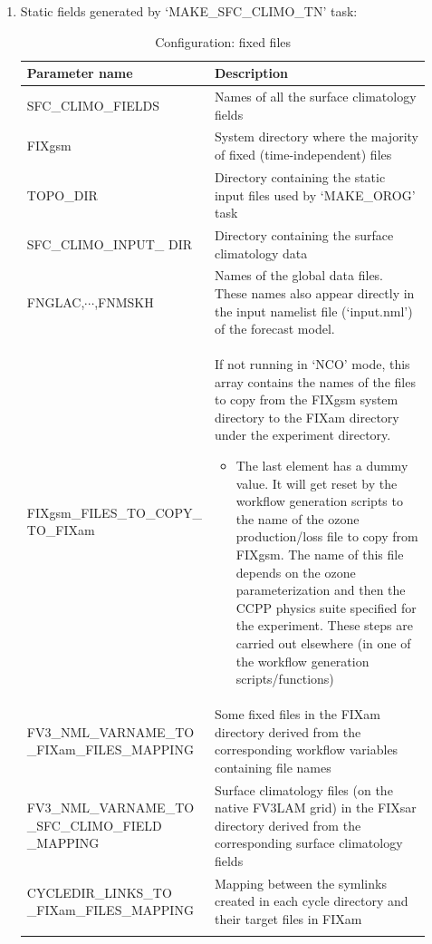 \documentclass[11pt,fleqn]{report}              %
\begin{document}
\begin{enumerate}
\item Static fields generated by `MAKE\_SFC\_CLIMO\_TN' task:
{
\scriptsize
\begin{longtable}{ p{0.23\linewidth} | p{0.7\linewidth} }
\hline
\hline
Parameter name & Description \\
\hline
SFC\_CLIMO\_FIELDS & Names of all the surface climatology fields \\
FIXgsm & System directory where the majority of fixed (time-independent) files \\
TOPO\_DIR & Directory containing the static input files used by `MAKE\_OROG' task \\
SFC\_CLIMO\_INPUT\_ DIR & Directory containing the surface climatology data \\
FNGLAC,$\cdots$,FNMSKH & Names of the global data files. These names also appear directly in the input namelist file (`input.nml') of the forecast model.  \\
FIXgsm\_FILES\_TO\_COPY\_ TO\_FIXam & If not running in `NCO' mode, this array contains the names of the files to copy from the FIXgsm system directory to the FIXam directory under the experiment directory. \begin{itemize} \item The last element has a dummy value. It will get reset by the workflow generation scripts to the name of the ozone production/loss file to copy from FIXgsm. The name of this file depends on the ozone parameterization and then the CCPP physics suite specified for the experiment. These steps are carried out elsewhere (in one of the workflow generation scripts/functions) \end{itemize} \\
FV3\_NML\_VARNAME\_TO \_FIXam\_FILES\_MAPPING & Some fixed files in the FIXam directory derived from the corresponding workflow variables containing file names \\
FV3\_NML\_VARNAME\_TO \_SFC\_CLIMO\_FIELD \_MAPPING & Surface climatology files (on the native FV3LAM grid) in the FIXsar directory derived from the corresponding surface climatology fields \\
CYCLEDIR\_LINKS\_TO \_FIXam\_FILES\_MAPPING & Mapping between the symlinks created in each cycle directory and their target files in FIXam \\
\hline
\caption{Configuration: fixed files }
\label{table:config_fixed}
\end{longtable}
}


\end{enumerate}
\end{document}
